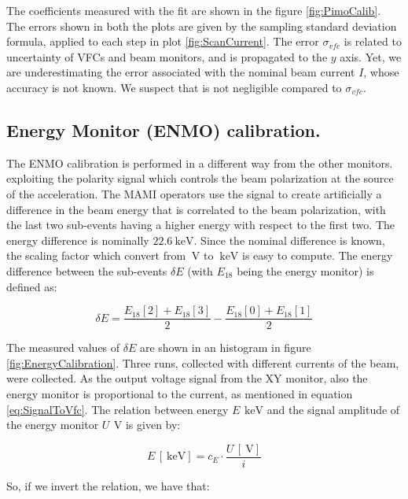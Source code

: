 The coefficients measured with the fit are shown in the figure \ref{fig:PimoCalib}. The errors shown in both the plots are given by the sampling standard deviation formula, applied to each step in plot \ref{fig:ScanCurrent}. The error $\sigma_{vfc}$ is related to uncertainty of VFCs and beam monitors, and is propagated to the $y$ axis. 
Yet, we are underestimating the error associated with the nominal beam current $I$, whose accuracy is not known. We suspect that is not negligible compared to $\sigma_{vfc}$.

\subsection{Energy Monitor (ENMO) calibration.} 

The ENMO calibration is performed in a different way from the other monitors. exploiting the polarity signal which controls the beam polarization at the source of the acceleration. The MAMI operators use the signal to create artificially a difference in the beam energy that is correlated to the beam polarization, with the last two sub-events having a higher energy with respect to the first two. The energy difference is nominally $\SI{22.6}{\kilo \electronvolt}$. Since the nominal difference is known, the scaling factor which convert from $\SI{}{\volt}$ to $\SI{}{\kilo \electronvolt}$ is easy to compute. The energy difference between the sub-events $\delta E$ (with $E_{18}$ being the energy monitor) is defined as:

\begin{equation*}
\delta E = \frac{E_{18}[2] + E_{18}[3]}{2} - \frac{E_{18}[0] + E_{18}[1]}{2} 
\end{equation*}

The measured values of $\delta E$ are shown in an histogram in figure \ref{fig:EnergyCalibration}. Three runs, collected with different currents of the beam, were collected. As the output voltage signal from the XY monitor, also the energy monitor is proportional to the current, as mentioned in equation \ref{eq:SignalToVfc}. The relation between energy $E \, \SI{}{\kilo \electronvolt}$ and the signal amplitude of the energy monitor $U \, \SI{}{\volt}$ is given by:

\begin{equation} \label{eq:EnergyVolt}
 E \, [\SI{}{\kilo \electronvolt}] = c_{E} \cdot \dfrac{ U \, [\SI{}{\volt}]}{i}
\end{equation}

So, if we invert the relation, we have that:

